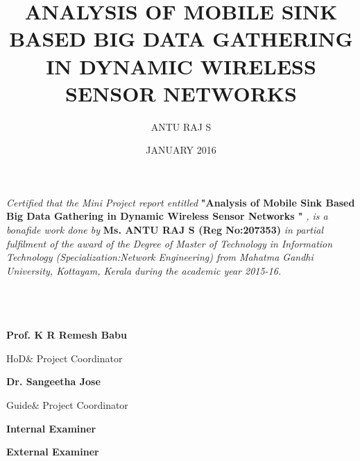 \documentclass[MTech]{iitmdiss}
\begin{document}
\nocite{*}
\setcounter{equation}{1}


\title{	
ANALYSIS OF MOBILE SINK BASED BIG DATA GATHERING IN DYNAMIC WIRELESS SENSOR NETWORKS}
\author{ANTU RAJ S}

\date{JANUARY 2016}

\maketitle

\certificate
\vspace*{0.2in}
\noindent 
 \textit{Certified that the Mini Project report entitled
} \textbf{"Analysis of Mobile Sink Based Big Data Gathering in Dynamic Wireless Sensor Networks
"} \textit{, is a bonafide work done by} \textbf{Ms. ANTU RAJ S (Reg No:207353)}\textit{ in partial fulfilment of the award of the Degree of Master of Technology in Information Technology (Specialization:Network Engineering) from Mahatma Gandhi University, Kottayam, Kerala during the academic year 2015-16.}
\\ \\ \\ \\
\vspace*{1.2in}
\hspace{.25in}
\begin{minipage}{0.18\textwidth}
\centerline{\bf Prof. K R Remesh Babu} 
\centerline{HoD$\& $ Project Coordinator} 
\end{minipage}
\begin{minipage}{.5\textwidth}
\hspace{0.15\textwidth}
\end{minipage}
\begin{minipage}{0.18\textwidth}
\centerline{\bf Dr. Sangeetha Jose} 
\centerline{Guide$\&$ Project Coordinator} 
\end{minipage}
\newline
\vspace{.15in}
\hspace{.25in}
\begin{minipage}{0.18\textwidth}
 \centerline{\bf Internal Examiner}
\end{minipage}
\begin{minipage}{.5\textwidth}
\hspace{0.15\textwidth}
\end{minipage}
\begin{minipage}{0.18\textwidth}
\centerline{\bf External Examiner}
\end{minipage}
 \vspace{3pt}
\end{document}
